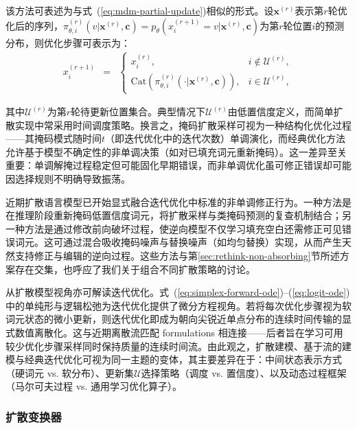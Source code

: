 该方法可表述为与式~(\ref{eq:mdm-partial-update})相似的形式。设$\mathbf{x}^{(r)}$表示第$r$轮优化后的序列，$\pi_{\theta,i}^{(r)}(v | \mathbf{x}^{(r)},\mathbf{c})=p_{\theta}(x_i^{(r+1)} = v | \mathbf{x}^{(r)},\mathbf{c})$为第$r$轮位置$i$的预测分布，则优化步骤可表示为：
\begin{eqnarray}
x_i^{(r+1)} & = &
\begin{cases}
x_i^{(r)}, & i\notin \mathcal{U}^{(r)},\\
\mathrm{Cat}\left(\pi^{(r)}_{\theta,i}(\cdot | \mathbf{x}^{(r)},\mathbf{c})\right), & i\in \mathcal{U}^{(r)},
\end{cases}
\label{eq:iterref-update}
\end{eqnarray}

\noindent 其中$\mathcal{U}^{(r)}$为第$r$轮待更新位置集合。典型情况下$\mathcal{U}^{(r)}$由低置信度定义，而简单扩散实现中常采用时间调度策略。换言之，掩码扩散采样可视为一种结构化优化过程——其掩码模式随时间$t$（即迭代优化中的迭代次数）单调演化，而经典优化方法允许基于模型不确定性的非单调决策（如对已填充词元重新掩码）。这一差异至关重要：单调解掩过程稳定但可能固化早期错误，而非单调优化虽可修正错误却可能因选择规则不明确导致振荡。

近期扩散语言模型已开始显式融合迭代优化中标准的非单调修正行为。一种方法是在推理阶段重新掩码低置信度词元，将扩散采样与类掩码预测的复查机制结合\citep{koh-etal:2025conditional,zhang-etal:2025corrective}；另一种方法是通过修改前向破坏过程，使逆向模型不仅学习填充空白还需修正可见错误词元。这可通过混合吸收掩码噪声与替换噪声（如均匀替换）实现，从而产生天然支持修正与编辑的逆向过程\citep{rutte-etal:2025generalized}。这些方法与第\ref{sec:rethink-non-absorbing}节所述方案存在交集，也呼应了我们关于组合不同扩散策略的讨论。

从扩散模型视角亦可解读迭代优化。式~(\ref{eq:simplex-forward-ode})--(\ref{eq:logit-ode})中的单纯形与逻辑松弛为迭代优化提供了微分方程视角。若将每次优化步骤视为软词元状态的微小更新，则迭代优化即成为朝向尖锐近单点分布的连续时间传输的显式数值离散化。这与近期离散流匹配 formulations 相连接——后者旨在学习可用较少优化步骤采样同时保持质量的连续时间流\citep{gat-etal:2024discrete,monsefi-etal:2025fs}。由此观之，扩散建模、基于流的建模与经典迭代优化可视为同一主题的变体，其主要差异在于：中间状态表示方式（硬词元 vs. 软分布）、更新集$\mathcal{U}$选择策略（调度 vs. 置信度）、以及动态过程框架（马尔可夫过程 vs. 通用学习优化算子）。
\subsubsection{扩散变换器}

